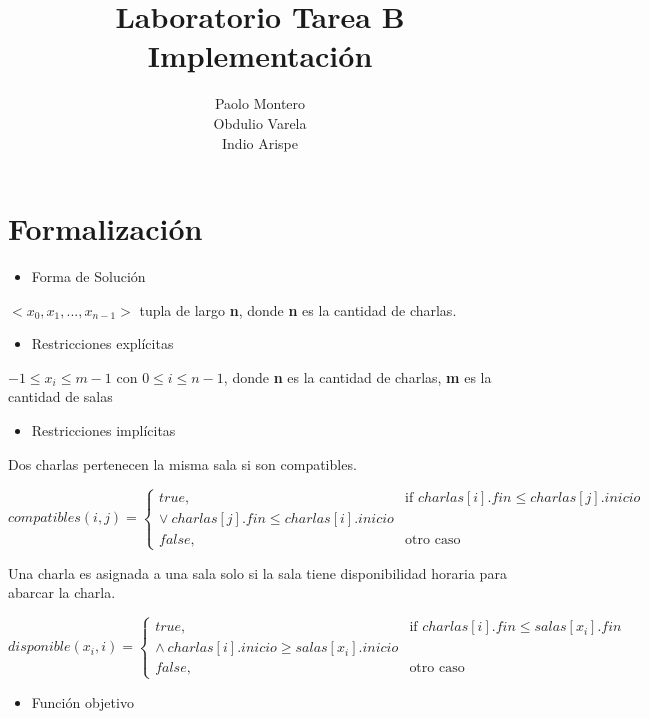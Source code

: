 \documentclass[11pt]{article}
\title{\textbf{Laboratorio Tarea B Implementación}}
\author{Paolo Montero\\
		Obdulio Varela\\
		Indio Arispe}
\date{}
\begin{document}
\maketitle
\newpage
\tableofcontents
\newpage
\section{Formalización}

\begin{itemize}
\item  Forma de Solución
\end{itemize}

$<x_0, x_1,..., x_{n-1}>$ tupla de largo \textbf{n}, donde \textbf{n} es la cantidad de charlas.

\begin{itemize}
\item  Restricciones explícitas
\end{itemize}

$-1 \leq x_i \leq m-1$ con $0 \leq i \leq n-1$, \newline
donde \textbf{n} es la cantidad de charlas, \textbf{m} es la cantidad de salas

\begin{itemize}
\item  Restricciones implícitas
\end{itemize}

Dos charlas pertenecen  la misma sala si son compatibles.

\[
    compatibles(i,j)= 
\begin{cases}
    true,& \text{if } charlas[i].fin \leq charlas[j].inicio\\ \lor \  charlas[j].fin \leq charlas[i].inicio\\
    false,              & \text{otro caso}
\end{cases}
\]


Una charla es asignada a una sala solo si la sala tiene disponibilidad horaria para abarcar la charla.

\[
    disponible(x_i,i)= 
\begin{cases}
    true,& \text{if } charlas[i].fin \leq salas[x_i].fin\\ \land \  charlas[i].inicio \geq salas[x_i].inicio\\
    false,              & \text{otro caso}
\end{cases}
\]

\begin{itemize}
\item  Función objetivo
\end{itemize}
\end{document}
